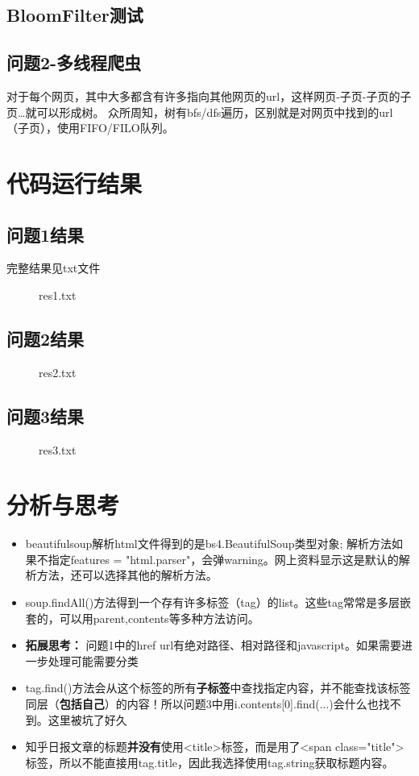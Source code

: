 \documentclass[12pt,a4paper]{article}
\begin{document}
\subsection{BloomFilter测试}

       
\subsection{问题2-多线程爬虫}
对于每个网页，其中大多都含有许多指向其他网页的url，这样网页-子页-子页的子页\dots 就可以形成树。
众所周知，树有bfs/dfs遍历，区别就是对网页中找到的url（子页），使用FIFO/FILO队列。

\section{代码运行结果}
\subsection{问题1结果}
完整结果见txt文件
\begin{figure}[H]
	 \caption{res1.txt}
\end{figure}

\subsection{问题2结果}
\begin{figure}[H]
	 \caption{res2.txt}
\end{figure}

\subsection{问题3结果}
\begin{figure}[H]
	 \caption{res3.txt}
\end{figure}

\section{分析与思考}
\begin{itemize}
	\item beautifulsoup解析html文件得到的是bs4.BeautifulSoup类型对象; 解析方法如果不指定features = "html.parser"，会弹warning。网上资料显示这是默认的解析方法，还可以选择其他的解析方法。
	\item soup.findAll()方法得到一个存有许多标签（tag）的list。这些tag常常是多层嵌套的，可以用parent,contents等多种方法访问。
	\item \textbf{拓展思考：} 问题1中的href url有绝对路径、相对路径和javascript。如果需要进一步处理可能需要分类
	\item tag.find()方法会从这个标签的所有\textbf{子标签}中查找指定内容，并不能查找该标签同层（\textbf{包括自己}）的内容！所以问题3中用i.contents[0].find(...)会什么也找不到。这里被坑了好久
	\item 知乎日报文章的标题\textbf{并没有}使用<title>标签，而是用了<span class="title">标签，所以不能直接用tag.title，因此我选择使用tag.string获取标题内容。
\end{itemize}
\end{document}
